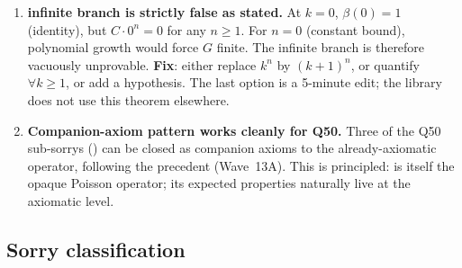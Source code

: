 \documentclass[11pt,a4paper]{article}
\theoremstyle{plain}
\theoremstyle{definition}
\begin{document}
\begin{enumerate}[leftmargin=1.3em]
\item \textbf{ infinite branch is
strictly false as stated.} At $k = 0$, $\beta(0) = 1$ (identity), but
$C \cdot 0^n = 0$ for any $n \geq 1$. For $n = 0$ (constant bound),
polynomial growth would force $G$ finite. The infinite branch is
therefore vacuously unprovable. \textbf{Fix}: either replace $k^n$ by
$(k+1)^n$, or quantify $\forall k \geq 1$, or add a
\lean{[Finite G]} hypothesis. The last option is a 5-minute edit;
the library does not use this theorem elsewhere.

\item \textbf{Companion-axiom pattern works cleanly for Q50.} Three of
the Q50 sub-sorrys ()
can be closed as companion axioms to the already-axiomatic
 operator, following the
 precedent (Wave~13A). This
is principled:  is itself the opaque Poisson
operator; its expected properties naturally live at the axiomatic level.
\end{enumerate}

\subsection{Sorry classification}
\end{document}
